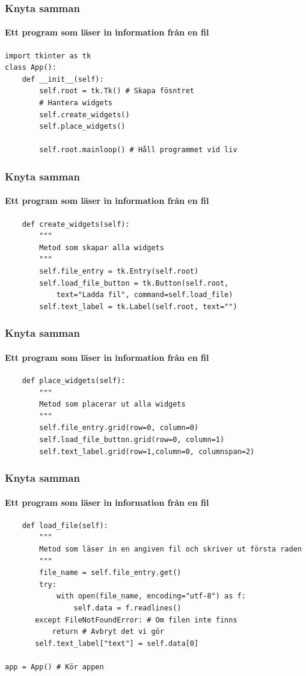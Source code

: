 \documentclass[aspectratio=169]{beamer}
\begin{document}
\begin{frame}[fragile]
	\frametitle{Knyta samman}
	\framesubtitle{Ett program som läser in information från en fil}
	
	\begin{lstlisting}
import tkinter as tk
class App():
    def __init__(self):
        self.root = tk.Tk() # Skapa fösntret
        # Hantera widgets
        self.create_widgets()
        self.place_widgets()
        
        self.root.mainloop() # Håll programmet vid liv
	\end{lstlisting}
	
\end{frame}

\begin{frame}[fragile]
	\frametitle{Knyta samman}
	\framesubtitle{Ett program som läser in information från en fil}
	
	\begin{lstlisting}
	def create_widgets(self):
	    """
	    Metod som skapar alla widgets
	    """
	    self.file_entry = tk.Entry(self.root)
	    self.load_file_button = tk.Button(self.root, 
	        text="Ladda fil", command=self.load_file)
	    self.text_label = tk.Label(self.root, text="")
	\end{lstlisting}
	
\end{frame}

\begin{frame}[fragile]
	\frametitle{Knyta samman}
	\framesubtitle{Ett program som läser in information från en fil}
	
	\begin{lstlisting}
	def place_widgets(self):
		"""
		Metod som placerar ut alla widgets
		"""
		self.file_entry.grid(row=0, column=0)
		self.load_file_button.grid(row=0, column=1)
		self.text_label.grid(row=1,column=0, columnspan=2)
	\end{lstlisting}
	
\end{frame}

\begin{frame}[fragile]
	\frametitle{Knyta samman}
	\framesubtitle{Ett program som läser in information från en fil}
	
	\begin{lstlisting}
	def load_file(self):
	    """
	    Metod som läser in en angiven fil och skriver ut första raden
	    """
	    file_name = self.file_entry.get()
	    try:
	        with open(file_name, encoding="utf-8") as f:
	            self.data = f.readlines()
       except FileNotFoundError: # Om filen inte finns
           return # Avbryt det vi gör
       self.text_label["text"] = self.data[0]

app = App() # Kör appen
	\end{lstlisting}
	
\end{frame}
\end{document}
